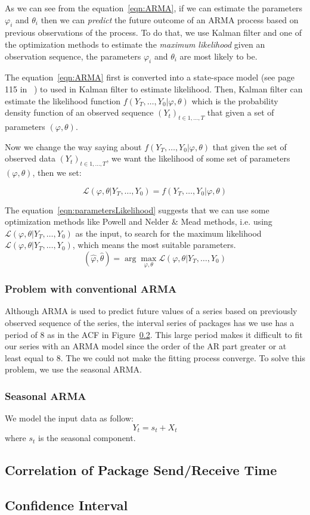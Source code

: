 \documentclass[12pt]{article}
\begin{document}
As we can see from the equation~\ref{eqn:ARMA}, if we can estimate the
parameters $\varphi_i$ and $\theta_i$ then we can \textit{predict} the future
outcome of an ARMA process based on previous observations of the process. To do
that, we use Kalman filter and one of the optimization methods to estimate the
\textit{maximum likelihood} given an observation sequence, the parameters
$\varphi_i$ and $\theta_i$ are most likely to be.

The equation~\ref{eqn:ARMA} first is converted into a state-space model (see
page 115 in~\cite{FalkStatSAS} ) to used in Kalman filter to estimate
likelihood. Then, Kalman filter can estimate the likelihood function
$f(Y_T,\ldots, Y_0|\varphi, \theta)$ which is the probability density
function of an observed sequence $(Y_t)_{t\in 1, \ldots, T}$ that given a set of
parameters $(\varphi, \theta)$.

Now we change the way saying about $f(Y_T,\ldots,Y_0|\varphi, \theta)$ that
given the set of observed data $(Y_t)_{t\in 1, \ldots, T}$, we want the likelihood of
some set of parameters $(\varphi, \theta)$, then we set:

\begin{equation}\label{eqn:parametersLikelihood}
\mathcal{L}(\varphi, \theta|Y_T,\ldots, Y_0) = f(Y_T,\ldots,Y_0|\varphi,
\theta)
\end{equation}

The equation~\ref{eqn:parametersLikelihood} suggests that we can use some
optimization methods like Powell and Nelder \& Mead methods, i.e. using
$\mathcal{L}(\varphi, \theta|Y_T,\ldots, Y_0)$ as the input, to search for the
maximum likelihood $\mathcal{L}(\varphi, \theta|Y_T,\ldots, Y_0)$, which means
the most suitable parameters.
\begin{equation}
(\hat{\varphi},\hat{\theta})=\arg\max_{\varphi, \theta} \mathcal{L}(\varphi,
\theta|Y_T,\ldots, Y_0)
\end{equation}

\subsubsection{Problem with conventional ARMA}
Although ARMA is used to predict future values of a series based on
previously observed sequence of the series, the interval series of packages has
we use has a period of 8 as in the ACF in Figure~\ref{}. This large period makes
it difficult to fit our series with an ARMA model since the order of the AR
part greater or at least equal to 8. The we could not make the fitting process
converge. To solve this problem, we use the seasonal ARMA.

\subsubsection{Seasonal ARMA}
We model the input data as follow:
\begin{equation}
Y_t = s_t + X_t
\end{equation}
where $s_t$ is the seasonal component.

\subsection{Correlation of Package Send/Receive Time}
\subsection{Confidence Interval}



\end{document}
